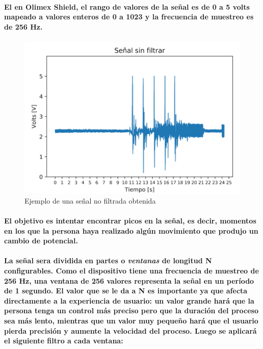 \documentclass{article}
\begin{document}
\paragraph{
El en Olimex Shield, el rango de valores de la señal es de 0 a 5 volts mapeado a valores enteros de 0 a 1023 y la frecuencia de muestreo es de 256 Hz.
}

\begin{figure}[ht]
    \centering
    \includegraphics[width=\textwidth]{no-filter.png}%
    \caption{Ejemplo de una señal no filtrada obtenida}
    \label{fig:no-filter}
\end{figure}

\paragraph{
El objetivo es intentar encontrar picos en la señal, es decir, momentos en los que la persona haya realizado algún movimiento que produjo un cambio de potencial.
}
\paragraph{
La señal sera dividida en partes o \textit{ventanas} de longitud N configurables. Como el dispositivo tiene una frecuencia de muestreo de 256 Hz, una ventana de 256 valores representa la señal en un período de 1 segundo. El valor que se le da a N es importante ya que afecta directamente a la experiencia de usuario: un valor grande hará que la persona tenga un control más preciso pero que la duración del proceso sea más lento, mientras que un valor muy pequeño hará que el usuario pierda precisión y aumente la velocidad del proceso. Luego se aplicará el siguiente filtro a cada ventana:
}
\end{document}
